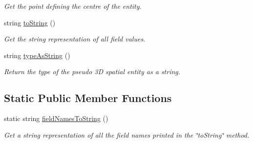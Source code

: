 \begin{DoxyCompactItemize}
\begin{DoxyCompactList}\small\item\em \-Get the point defining the centre of the entity. \end{DoxyCompactList}\item 
string \hyperlink{classmultiscale_1_1analysis_1_1SpatialEntityPseudo3D_abea1af0695f6f1a977b0caa3428fc433}{to\-String} ()
\begin{DoxyCompactList}\small\item\em \-Get the string representation of all field values. \end{DoxyCompactList}\item 
string \hyperlink{classmultiscale_1_1analysis_1_1SpatialEntityPseudo3D_ae8b5c03174d91efc64509dec1a01e69c}{type\-As\-String} ()
\begin{DoxyCompactList}\small\item\em \-Return the type of the pseudo 3\-D spatial entity as a string. \end{DoxyCompactList}\end{DoxyCompactItemize}
\subsection*{\-Static \-Public \-Member \-Functions}
\begin{DoxyCompactItemize}
\item 
static string \hyperlink{classmultiscale_1_1analysis_1_1SpatialEntityPseudo3D_a3c24e3f06c999002f18e1ddd8be3f927}{field\-Names\-To\-String} ()
\begin{DoxyCompactList}\small\item\em \-Get a string representation of all the field names printed in the \char`\"{}to\-String\char`\"{} method. \end{DoxyCompactList}\end{DoxyCompactItemize}
